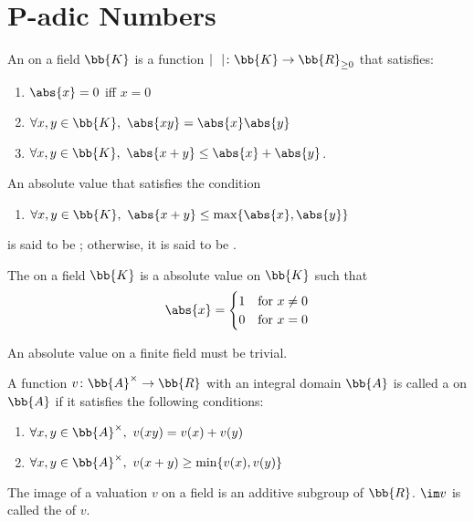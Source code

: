 \section{P-adic Numbers}\cite{gouvea}
An  on a field $\bb{K}$ is a function $\mid \ \ \mid \colon \bb{K} \to \bb{R}_{\ge0}$ that satisfies:
\begin{enumerate}
\item $\abs{x} = 0$ iff $x = 0$
\item $\forall x, y \in \bb{K},\ \abs{xy} = \abs{x}\abs{y}$
\item $\forall x, y \in \bb{K},\ \abs{x+y} \le \abs{x}+\abs{y}$.
\end{enumerate}

An absolute value that satisfies the condition
\begin{enumerate}[resume*]
\item $\forall x, y \in \bb{K},\ \abs{x+y} \le \max \{ \abs{x},\abs{y} \}$
\end{enumerate}
is said to be ; otherwise, it is said to be .

The  on a field $\bb{K}$ is a absolute value on $\bb{K}$ such that
\[
\abs{x} = \begin{cases}
 1 & \text{for}\ x \neq 0 \\
 0 & \text{for}\ x = 0
 \end{cases}
\]

An absolute value on a finite field must be trivial.

A function $v \colon \bb{A}^\times \to \bb{R}$ with an integral domain $\bb{A}$ is called a  on $\bb{A}$ if it satisfies the following conditions:
\begin{enumerate}
\item $\forall x, y \in \bb{A}^\times,\ v(xy) = v(x) + v(y)$
\item $\forall x, y \in \bb{A}^\times,\ v(x+y) \ge \min \{ v(x), v(y) \}$
\end{enumerate}

The image of a valuation $v$ on a field is an additive subgroup of $\bb{R}$. $\im v$ is called the  of $v$.

